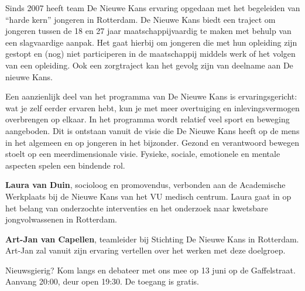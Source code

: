 \documentclass{article}
\begin{document}
\vfill


Sinds 2007 heeft team De Nieuwe Kans ervaring opgedaan met het begeleiden van
``harde kern'' jongeren in Rotterdam. De Nieuwe Kans biedt een traject om
jongeren tussen de 18 en 27 jaar maatschappijvaardig te maken met behulp van
een slagvaardige aanpak. Het gaat hierbij om jongeren die met hun opleiding
zijn gestopt en (nog) niet participeren in de maatschappij middels werk of het
volgen van een opleiding. Ook een zorgtraject kan het gevolg zijn van deelname
aan De nieuwe Kans.

Een aanzienlijk deel van het programma van De Nieuwe Kans is ervaringsgericht:
wat je zelf eerder ervaren hebt, kun je met meer overtuiging en
inlevingsvermogen overbrengen op elkaar. In het programma wordt relatief veel
sport en beweging aangeboden. Dit is ontstaan vanuit de visie die De Nieuwe
Kans heeft op de mens in het algemeen en op jongeren in het bijzonder. Gezond
en verantwoord bewegen stoelt op een meerdimensionale visie. Fysieke, sociale,
emotionele en mentale aspecten spelen een bindende rol.

\vfill


\textbf{Laura van Duin},
  socioloog en promovendus, verbonden aan de Academische Werkplaats bij de
  Nieuwe Kans van het VU medisch centrum. Laura gaat in op het belang van
  onderzochte interventies en het onderzoek naar kwetsbare jongvolwassenen in
  Rotterdam.

\textbf{Art-Jan van Capellen},
  teamleider bij Stichting De Nieuwe Kans in Rotterdam. Art-Jan zal vanuit zijn
  ervaring vertellen over het werken met deze doelgroep.

\vfill

Nieuwsgierig? Kom langs en debateer met ons mee op 13 juni op de Gaffelstraat.
Aanvang 20:00, deur open 19:30. De toegang is gratis.

\myhline
\end{document}
